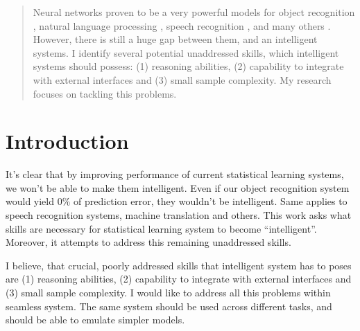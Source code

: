 \documentclass{article}
\begin{document}
 


\begin{abstract}

Neural networks proven to be a very powerful models for object recognition \cite{krizhevsky2012imagenet}, 
natural language processing \cite{mikolov2012statistical}, speech recognition \cite{graves2013speech}, and many others \cite{sutskever2014sequence}. 
However, there is still a huge gap between them, and an intelligent systems. 
I identify several potential unaddressed skills, which intelligent systems should possess: 
(1) reasoning abilities, (2) capability to integrate with external interfaces and (3) small sample complexity. My research focuses on tackling this problems. 

\end{abstract} 

\section{Introduction}
It's clear that by improving performance of current statistical learning systems, 
we won't be able to make them intelligent. Even if our object recognition system would yield
$0\%$ of prediction error, they wouldn't be intelligent. Same applies to speech 
recognition systems, machine translation and others. This work asks what skills are necessary for statistical
learning system to become ``intelligent''. Moreover, it attempts to address this remaining unaddressed skills. 


I believe, that crucial, poorly addressed skills that intelligent system has to poses are
(1) reasoning abilities, (2) capability to integrate with external interfaces and (3) small sample complexity. 
I would like to address all this problems within seamless system. The same system should be used across
different tasks, and should be able to emulate simpler models. 
\end{document}
